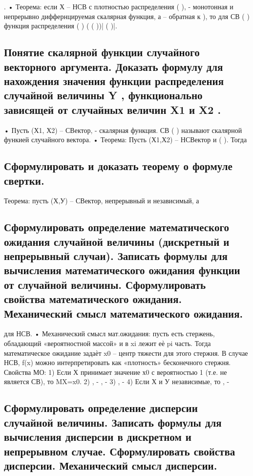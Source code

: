 .
• Теорема: если Х – НСВ с плотностью распределения
( ), - монотонная и непрерывно диффернцируемая скалярная функция, а
– обратная к ), то для СВ ( ) функция распределения
( ) ( ( ))|
( )|.

\subsection{Понятие скалярной функции случайного векторного аргумента. Доказать формулу для нахождения значения функции распределения случайной величины Y , функционально зависящей от случайных величин X1 и X2 .}

• Пусть (Х1, Х2) – СВектор, - скалярная функция. СВ (
) называют скалярной функией случайного вектора.
• Теорема: Пусть (Х1,Х2) – НСВектор и ( ). Тогда


\subsection{Сформулировать и доказать теорему о формуле свертки.}

Теорема: пусть (Х,У) – СВектор, непрерывный и независимый, а




\subsection{Сформулировать определение математического ожидания случайной величины (дискретный и непрерывный случаи). Записать формулы для вычисления математического ожидания функции от случайной величины. Сформулировать свойства математического ожидания. Механический смысл математического ожидания.}



для НСВ.
• Механический смысл мат.ожидания: пусть есть стержень, обладающий «вероятностной массой» и в xi лежит еѐ pi часть. Тогда
математическое ожидание задаѐт x0 – центр тяжести для этого стержня. В случае НСВ, f(x) можно интерпретировать как «плотность»
бесконечного стержня.
Свойства МО:
1) Если Х принимает значение х0 с вероятностью 1 (т.е. не является СВ), то MX=x0.
2) , - , -
3) , -
4) Если Х и У независимые, то , - 

\subsection{Сформулировать определение дисперсии случайной величины. Записать формулы для вычисления дисперсии в дискретном и непрерывном случае. Сформулировать свойства дисперсии. Механический смысл дисперсии.}

